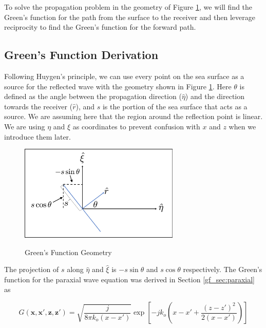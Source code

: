 To solve the propagation problem in the geometry of Figure \ref{mp_fig:2a}, we will find the Green's function for the path from the surface to the receiver and then leverage reciprocity to find the Green's function for the forward path.

\subsection{Green's Function Derivation}
Following Huygen's principle, we can use every point on the sea surface as a source for the reflected wave with the geometry shown in Figure \ref{mp_fig:2a}. Here $\theta$ is defined as the angle between the propagation direction ($\hat{\eta}$) and the direction towards the receiver ($\hat{r}$), and $s$ is the portion of the sea surface that acts as a source. We are assuming here that the region around the reflection point is linear. We are using $\eta$ and $\xi$ as coordinates to prevent confusion with $x$ and $z$ when we introduce them later.

\begin{figure}[H]
  \begin{center}
\includegraphics[width=3in]{../media/analysis/gf_geometry.png}
  \end{center}
  \renewcommand{\baselinestretch}{1} \small\normalsize
  \begin{quote}
    \caption[Green's Function Geometry ]{Green's Function Geometry\label{mp_fig:2a}}
  \end{quote}
\end{figure}
\renewcommand{\baselinestretch}{2} \small\normalsize

The projection of $s$ along $\hat{\eta}$ and $\hat{\xi}$ is $-s\sin\theta$ and $s\cos\theta$ respectively. The Green's function for the paraxial wave equation was derived in Section \ref{gf_sec:paraxial} as

\begin{equation}
G\left(\boldsymbol{x},\boldsymbol{x}',\boldsymbol{z},\boldsymbol{z}' \right)= \sqrt{\frac{j}{8\pi k_o(x-x')}}\exp\left[-jk_o\left(x -x' + \frac{(z-z')^2}{2(x-x')}\right) \right]
\label{mp_eq:11aa}
\end{equation}

